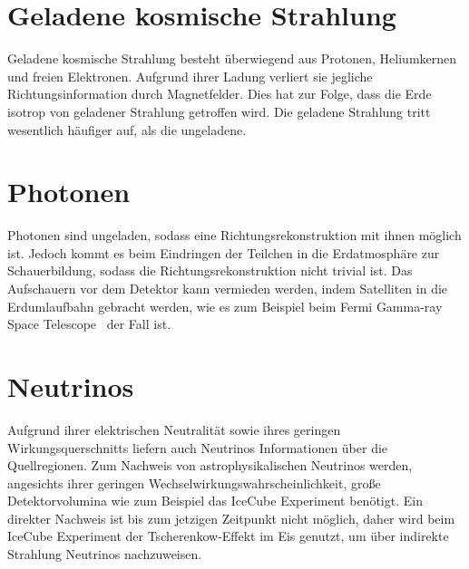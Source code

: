 \section*{Geladene kosmische Strahlung}
Geladene kosmische Strahlung besteht überwiegend aus Protonen, Heliumkernen und freien Elektronen. 
Aufgrund ihrer Ladung verliert sie jegliche Richtungsinformation durch Magnetfelder. 
Dies hat zur Folge, dass die Erde isotrop von geladener Strahlung getroffen wird.
Die geladene Strahlung tritt wesentlich häufiger auf, als die ungeladene. 

\section*{Photonen}
Photonen sind ungeladen, sodass eine Richtungsrekonstruktion mit ihnen möglich ist. 
Jedoch kommt es beim Eindringen der Teilchen in die Erdatmosphäre zur Schauerbildung, sodass die Richtungsrekonstruktion nicht trivial ist. 
Das Aufschauern vor dem Detektor kann vermieden werden, indem Satelliten in die Erdumlaufbahn gebracht werden, wie es zum Beispiel beim Fermi Gamma-ray Space Telescope~\cite{fermi} der Fall ist.

\section*{Neutrinos}
Aufgrund ihrer elektrischen Neutralität sowie ihres geringen Wirkungsquerschnitts liefern auch Neutrinos Informationen über die Quellregionen. 
Zum Nachweis von astrophysikalischen Neutrinos werden, angesichts ihrer geringen Wechselwirkungswahrscheinlichkeit, große Detektorvolumina wie zum Beispiel das IceCube Experiment benötigt.
Ein direkter Nachweis ist bis zum jetzigen Zeitpunkt nicht möglich, daher wird beim IceCube Experiment \cite{icecube} der Tscherenkow-Effekt im Eis genutzt, um über indirekte Strahlung Neutrinos nachzuweisen.
